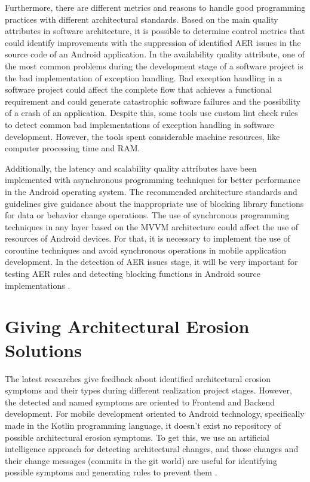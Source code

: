 Furthermore, there are different metrics and reasons to handle good programming practices with different architectural standards. Based on the main quality attributes in software architecture, it is possible to determine control metrics that could identify improvements with the suppression of identified AER issues in the source code of an Android application.
In the availability quality attribute, one of the most common problems during the development stage of a software project is the bad implementation of exception handling. Bad exception handling in a software project could affect the complete flow that achieves a functional requirement and could generate catastrophic software failures and the possibility of a crash of an application. Despite this, some tools use custom lint check rules to detect common bad implementations of exception handling in software development. However, the tools spent considerable machine resources, like computer processing time and RAM. \cite{handle-exceptions-references}

Additionally, the latency and scalability quality attributes have been implemented with asynchronous programming techniques for better performance in the Android operating system. The recommended architecture standards and guidelines give guidance about the inappropriate use of blocking library functions for data or behavior change operations. The use of synchronous programming techniques in any layer based on the MVVM architecture could affect the use of resources of Android devices. For that, it is necessary to implement the use of coroutine techniques and avoid synchronous operations in mobile application development. In the detection of AER issues stage, it will be very important for testing AER rules and detecting blocking functions in Android source implementations \cite{performance-coroutines-reference}.


\section{Giving Architectural Erosion Solutions}
The latest researches give feedback about identified architectural erosion symptoms and their types during different realization project stages. However, the detected and named symptoms are oriented to Frontend and Backend development. For mobile development oriented to Android technology, specifically made in the Kotlin programming language, it doesn't exist no repository of possible architectural erosion symptoms. To get this, we use an artificial intelligence approach for detecting architectural changes, and those changes and their change messages (commits in the git world) are useful for identifying possible symptoms and generating rules to prevent them \cite{aer-metrics-paper}.


